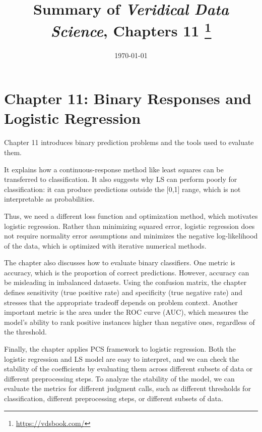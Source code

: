 \documentclass[letterpaper, 11pt]{article}
\title{\vspace{-1.5cm} Summary of \textit{Veridical Data Science}, Chapters 11 \footnote{\url{https://vdsbook.com/}}}
\date{\today}
\begin{document}
\hypersetup{colorlinks=true, linkcolor=blue, urlcolor=blue}
\maketitle

\section*{Chapter 11: Binary Responses and Logistic Regression}

Chapter 11 introduces binary prediction problems and the tools used to evaluate them.

It explains how a continuous-response method like least squares can be transferred to classification.
It also suggests why LS can perform poorly for classification: it can produce predictions outside the [0,1] range, which is not interpretable as probabilities.

Thus, we need a different loss function and optimization method, which motivates logistic regression.
Rather than minimizing squared error, logistic regression does not require normality error assumptions
and minimizes the negative log-likelihood of the data, which is optimized with iterative numerical methods.

The chapter also discusses how to evaluate binary classifiers.
One metric is accuracy, which is the proportion of correct predictions. However, accuracy can be misleading in imbalanced datasets.
Using the confusion matrix, the chapter defines sensitivity (true positive rate) and specificity (true negative rate) and stresses that the appropriate tradeoff depends on problem context.
Another important metric is the area under the ROC curve (AUC), which measures the model's ability to rank positive instances higher than negative ones, regardless of the threshold.

Finally, the chapter applies PCS framework to logistic regression.
Both the logistic regression and LS model are easy to interpret, and we can check the stability of the coefficients by evaluating them across different subsets of data or different preprocessing steps.
To analyze the stability of the model, we can evaluate the metrics for different judgment calls, such as different thresholds for classification, different preprocessing steps, or different subsets of data.

\end{document}
